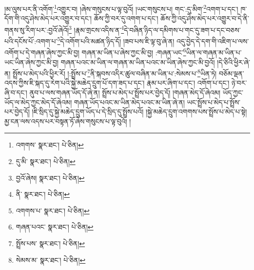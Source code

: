 །མ་ལུས་པར་ནི་འགོག་\footnote{འགགས་  སྣར་ཐང་།  པེ་ཅིན། }འགྱུར་བ། །ཞེས་གསུངས་པ་ལྟ་བུའོ། །ཡང་གསུངས་པ། གང་:དུ་མིག་\footnote{དུ་མི་  སྣར་ཐང་།  པེ་ཅིན། }འགག་པ་དང་། ཁ་དོག་གི་འདུ་ཤེས་མེད་པར་འགྱུར་བ་དང་། ཆོས་ཀྱི་བར་དུ་འགག་པ་དང་། ཆོས་ཀྱི་འདུ་ཤེས་མེད་པར་འགྱུར་བ་དེ་ནི་གནས་སུ་རིག་པར་:བྱའོ་ཞེའོ།\footnote{བྱའོ་ཞེས།  སྣར་ཐང་།  པེ་ཅིན། } །རྣམ་གྲངས་འདིས་ན་\footnote{ནི་  སྣར་ཐང་།  པེ་ཅིན། }དེ་བཞིན་ཉིད་ལ་དམིགས་པ་གང་དུ་ཟག་པ་དང་བཅས་པའི་དངོས་པོ་:འགག་པ་\footnote{འགགས་པ་  སྣར་ཐང་།  པེ་ཅིན། }དེ་འགོག་པའི་མཚན་ཉིད་དོ། །ཟབ་པས་ཇི་ལྟ་བུ་ཞེ་ན། འདུ་བྱེད་དེ་དག་གི་འཇིག་པ་ལས་འགོག་པ་དེ་གཞན་ཞེས་ཀྱང་མི་བྱ། གཞན་མ་ཡིན་པ་ཞེས་ཀྱང་མི་བྱ། :གཞན་ཡང་\footnote{གཞན་པའང་  སྣར་ཐང་།  པེ་ཅིན། }ཡིན་ལ་གཞན་མ་ཡིན་པ་ཡང་ཡིན་ཞེས་ཀྱང་མི་བྱ། གཞན་པའང་མ་ཡིན་ལ་གཞན་མ་ཡིན་པའང་མ་ཡིན་ཞེས་ཀྱང་མི་བྱའོ། །དེ་ཅིའི་ཕྱིར་ཞེ་ན། སྤྲོས་པ་མེད་པའི་ཕྱིར་རོ། །:སྤྲོས་པ་\footnote{སྤྲོས་པས་  སྣར་ཐང་།  པེ་ཅིན། }ནི་སྐབས་འདིར་ཚུལ་བཞིན་མ་ཡིན་པ་:སེམས་པ་\footnote{སེམས་མ་  སྣར་ཐང་།  པེ་ཅིན། }ཡིན་ཏེ། བཅོམ་ལྡན་འདས་ཀྱིས་ཇི་སྐད་དུ་རེག་པའི་སྐྱེ་མཆེད་དྲུག་པོ་དག་ཟད་པ་དང་། རྣམ་པར་ཞིག་པ་དང་། འགོག་པ་དང་། ཉེ་བར་ཞི་བ་དང་། ནུབ་པ་ལས་གཞན་ཡོད་དོ་ཞེ་ན། སྤྲོས་པ་མེད་པ་སྤྲོས་པར་བྱེད་དོ། །གཞན་མེད་དོ་ཞེའམ། ཡོད་ཀྱང་ཡོད་ལ་མེད་ཀྱང་མེད་དོ་ཞེའམ། གཞན་ཡོད་པའང་མ་ཡིན་མེད་པའང་མ་ཡིན་ཞེ་ན། ཡང་སྤྲོས་པ་མེད་པ་སྤྲོས་པར་བྱེད་དོ། །ཇི་སྲིད་དུ་སྐྱེ་མཆེད་དྲུག་ཡོད་པ་དེ་སྲིད་དུ་སྤྲོས་པའོ། །སྐྱེ་མཆེད་དྲུག་འགགས་པས་སྤྲོས་པ་མེད་པ་སྟེ། མྱ་ངན་ལས་འདས་པར་བསྟན་ཏོ་ཞེས་གསུངས་པ་ལྟ་བུའོ། །
